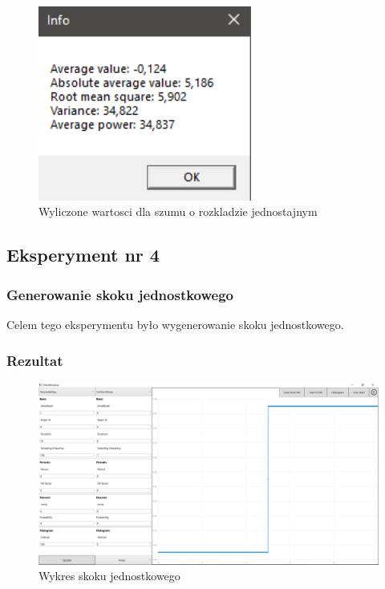 \documentclass[12pt]{article}
\begin{document}
\begin{figure}[H]
 \centering
 \includegraphics[width=7cm]{images/uni1info.PNG}
 \vspace{-0.3cm}
 \caption{Wyliczone wartosci dla szumu o rozkladzie jednostajnym}
 \label{gui}
\end{figure}



\subsection{Eksperyment nr 4 }
\subsubsection{Generowanie skoku jednostkowego}
Celem tego eksperymentu było wygenerowanie skoku jednostkowego.


\subsubsection{Rezultat}

\begin{figure}[H]
 \centering
 \includegraphics[width=14cm]{images/heav1.PNG}
 \vspace{-0.3cm}
 \caption{Wykres skoku jednostkowego}
 \label{gui}
\end{figure}
\end{document}

